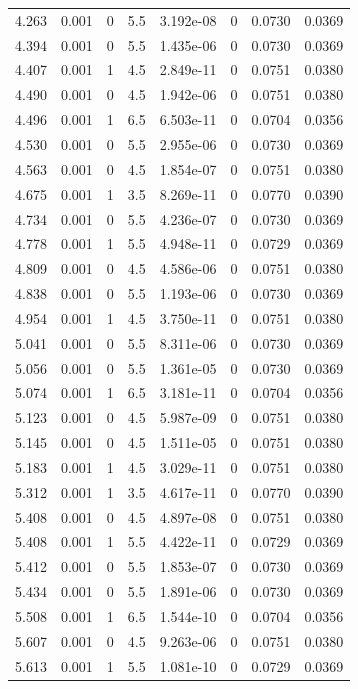 \documentclass[preview]{standalone}
\begin{document}
{{{\begin{tabular}{L{1.2cm}C{1.2cm} C{0.3cm}C{0.5cm} C{1.4cm}C{1.4cm} C{1.4cm}C{1.4cm}}
  4.263  &  0.001  & 0     & 5.5 &  3.192e-08  & 0  & 0.0730 &  0.0369   \\ 
  4.394  &  0.001  & 0     & 5.5 &  1.435e-06  & 0  & 0.0730 &  0.0369   \\ 
  4.407  &  0.001  & 1     & 4.5 &  2.849e-11  & 0  & 0.0751 &  0.0380   \\ 
  4.490  &  0.001  & 0     & 4.5 &  1.942e-06  & 0  & 0.0751 &  0.0380   \\ 
  4.496  &  0.001  & 1     & 6.5 &  6.503e-11  & 0  & 0.0704 &  0.0356   \\ 
  4.530  &  0.001  & 0     & 5.5 &  2.955e-06  & 0  & 0.0730 &  0.0369   \\ 
  4.563  &  0.001  & 0     & 4.5 &  1.854e-07  & 0  & 0.0751 &  0.0380   \\ 
  4.675  &  0.001  & 1     & 3.5 &  8.269e-11  & 0  & 0.0770 &  0.0390   \\ 
  4.734  &  0.001  & 0     & 5.5 &  4.236e-07  & 0  & 0.0730 &  0.0369   \\ 
  4.778  &  0.001  & 1     & 5.5 &  4.948e-11  & 0  & 0.0729 &  0.0369   \\ 
  4.809  &  0.001  & 0     & 4.5 &  4.586e-06  & 0  & 0.0751 &  0.0380   \\ 
  4.838  &  0.001  & 0     & 5.5 &  1.193e-06  & 0  & 0.0730 &  0.0369   \\ 
  4.954  &  0.001  & 1     & 4.5 &  3.750e-11  & 0  & 0.0751 &  0.0380   \\ 
  5.041  &  0.001  & 0     & 5.5 &  8.311e-06  & 0  & 0.0730 &  0.0369   \\ 
  5.056  &  0.001  & 0     & 5.5 &  1.361e-05  & 0  & 0.0730 &  0.0369   \\ 
  5.074  &  0.001  & 1     & 6.5 &  3.181e-11  & 0  & 0.0704 &  0.0356   \\ 
  5.123  &  0.001  & 0     & 4.5 &  5.987e-09  & 0  & 0.0751 &  0.0380   \\ 
  5.145  &  0.001  & 0     & 4.5 &  1.511e-05  & 0  & 0.0751 &  0.0380   \\ 
  5.183  &  0.001  & 1     & 4.5 &  3.029e-11  & 0  & 0.0751 &  0.0380   \\ 
  5.312  &  0.001  & 1     & 3.5 &  4.617e-11  & 0  & 0.0770 &  0.0390   \\ 
  5.408  &  0.001  & 0     & 4.5 &  4.897e-08  & 0  & 0.0751 &  0.0380   \\ 
  5.408  &  0.001  & 1     & 5.5 &  4.422e-11  & 0  & 0.0729 &  0.0369   \\ 
  5.412  &  0.001  & 0     & 5.5 &  1.853e-07  & 0  & 0.0730 &  0.0369   \\ 
  5.434  &  0.001  & 0     & 5.5 &  1.891e-06  & 0  & 0.0730 &  0.0369   \\ 
  5.508  &  0.001  & 1     & 6.5 &  1.544e-10  & 0  & 0.0704 &  0.0356   \\ 
  5.607  &  0.001  & 0     & 4.5 &  9.263e-06  & 0  & 0.0751 &  0.0380   \\ 
  5.613  &  0.001  & 1     & 5.5 &  1.081e-10  & 0  & 0.0729 &  0.0369   \\ 
\hline 
\end{tabular} 

}}}
\end{document}
